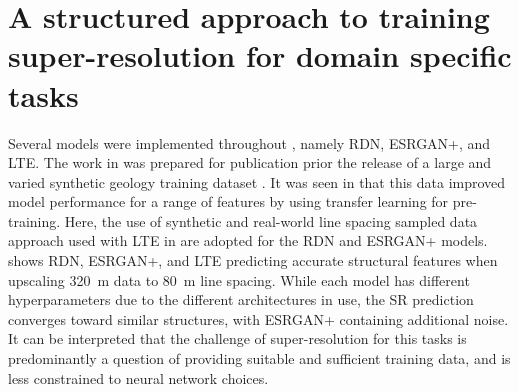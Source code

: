 \section[Super-resolution for domain specific tasks]{A structured approach to training super-resolution for domain specific tasks}
Several models were implemented throughout , namely RDN\textdaggerdbl{}, ESRGAN+, and LTE\@.
The work in  was prepared for publication prior the release of a large and varied synthetic geology training dataset \parencite{jessellNoddyverseMassiveData2022}.
It was seen in  that this data improved model performance for a range of features by using transfer learning for pre-training.
Here, the use of synthetic and real-world line spacing sampled data approach used with LTE in  are adopted for the RDN\textdaggerdbl{} and ESRGAN+ models.
 shows RDN\textdaggerdbl{}, ESRGAN+, and LTE predicting accurate structural features when upscaling \qty{320}{\m} data to \qty{80}{\m} line spacing.
While each model has different hyperparameters due to the different architectures in use, the SR prediction converges toward similar structures, with ESRGAN+ containing additional noise.
It can be interpreted that the challenge of super-resolution for this tasks is predominantly a question of providing suitable and sufficient training data, and is less constrained to neural network choices.

